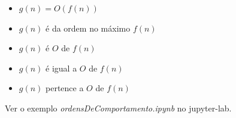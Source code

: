 \begin{frame}
{		\begin{itemize}
			\item $g(n) = O(f(n))$
			\item $g(n)$ é da ordem no máximo $f(n)$
			\item $g(n)$ é $O$ de $f(n)$
			\item $g(n)$ é igual a $O$ de $f(n)$
			\item $g(n)$ pertence a $O$ de $f(n)$
		\end{itemize}
		
		\par Ver o exemplo \textit{ordensDeComportamento.ipynb} no jupyter-lab.
	}
\end{frame}